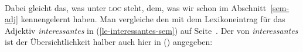 \begin{schema}
\label{rs-schema-sem}
\samepage
{} \impl\\
\end{schema}

\noindent
Dabei gleicht das, was unter \textsc{loc} steht, dem, was wir schon im Abschnitt~\ref{sem-adj}
kennengelernt haben. Man vergleiche den \locw mit dem Lexikoneintrag für das
Adjektiv \emph{interessantes} in (\ref{le-interessantes-sem}) auf
Seite~\pageref{le-interessantes-sem}. Der \locw von \emph{interessantes} ist der Übersichtlichkeit
halber auch hier in () angegeben:

